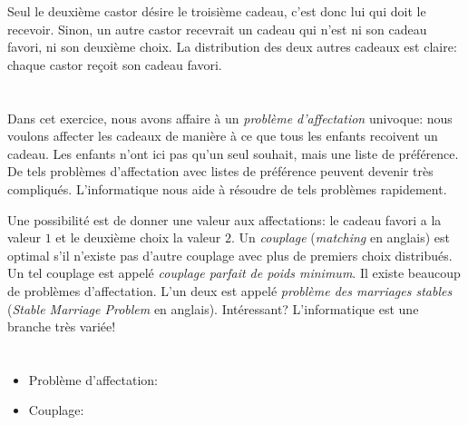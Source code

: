 {{{\centering%
\par}

Seul le deuxième castor désire le troisième cadeau, c’est donc lui qui doit le recevoir. Sinon, un autre castor recevrait un cadeau qui n’est ni son cadeau favori, ni son deuxième choix. La distribution des deux autres cadeaux est claire: chaque castor reçoit son cadeau favori.



\section*{\BrochureItsInformatics}
Dans cet exercice, nous avons affaire à un \emph{problème d’affectation} univoque: nous voulons affecter les cadeaux de manière à ce que tous les enfants recoivent un cadeau. Les enfants n’ont ici pas qu’un seul souhait, mais une liste de préférence. De tels problèmes d’affectation avec listes de préférence peuvent devenir très compliqués. L’informatique nous aide à résoudre de tels problèmes rapidement.

Une possibilité est de donner une valeur aux affectations: le cadeau favori a la valeur $1$ et le deuxième choix la valeur $2$. Un \emph{couplage} (\emph{matching} en anglais) est optimal s’il n’existe pas d’autre couplage avec plus de premiers choix distribués. Un tel couplage est appelé \emph{couplage parfait de poids minimum}. Il existe beaucoup de problèmes d’affectation. L’un deux est appelé \emph{problème des marriages stables} (\emph{Stable Marriage Problem} en anglais). Intéressant? L’informatique est une branche très variée!



\section*{\BrochureWebsitesAndKeywords}
{\raggedright
\begin{itemize}
  \item Problème d’affectation: \href{https://fr.wikipedia.org/wiki/Probl\%C3\%A8me_d\%27affectation}{}
  \item Couplage: \href{https://fr.wikipedia.org/wiki/Couplage_(th\%C3\%A9orie_des_graphes)}{}
\end{itemize}


}}}
